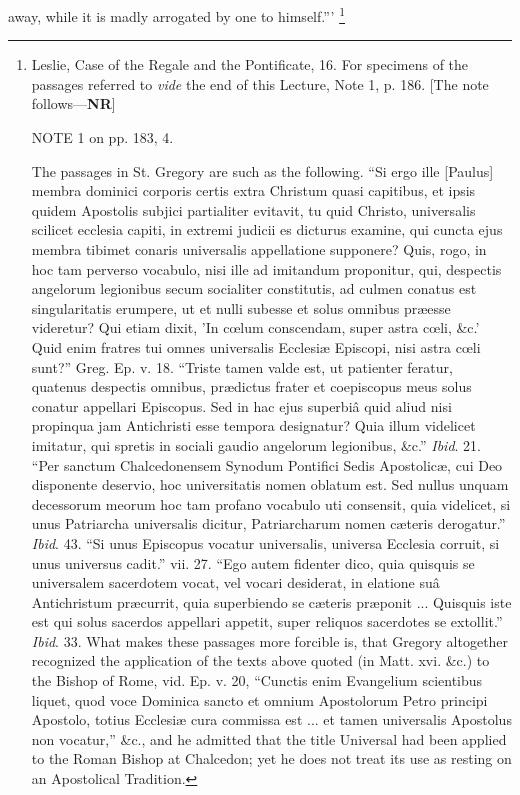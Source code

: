 away, while it is madly arrogated by one to himself.''' \footnote{Leslie, Case of the Regale and the
Pontificate, 16. For specimens of the passages referred to \emph{vide}
the end of this Lecture, Note 1, p. 186. [The note follows—\textbf{NR}]

NOTE
1 on pp. 183, 4.

The passages in St. Gregory are such as the
following. ``Si ergo ille [Paulus] membra dominici corporis certis
extra Christum quasi capitibus, et ipsis quidem Apostolis subjici
partialiter evitavit, tu quid Christo, universalis scilicet ecclesia
capiti, in extremi judicii es dicturus examine, qui cuncta ejus membra
tibimet conaris universalis appellatione supponere? Quis, rogo, in hoc
tam perverso vocabulo, nisi ille ad imitandum proponitur, qui,
despectis angelorum legionibus secum socialiter constitutis, ad culmen
conatus est singularitatis erumpere, ut et nulli subesse et solus
omnibus præesse videretur? Qui etiam dixit, 'In cœlum conscendam,
super astra cœli, \&c.' Quid enim fratres tui omnes universalis
Ecclesiæ Episcopi, nisi astra cœli sunt?'' Greg. Ep. v. 18.
``Triste tamen valde est, ut patienter feratur, quatenus despectis
omnibus, prædictus frater et coepiscopus meus solus conatur appellari
Episcopus. Sed in hac ejus superbiâ quid aliud nisi propinqua jam
Antichristi esse tempora designatur? Quia illum videlicet imitatur,
qui spretis in sociali gaudio angelorum legionibus, \&c.'' \emph{Ibid}.
21. ``Per sanctum Chalcedonensem Synodum Pontifici Sedis
Apostolicæ, cui Deo disponente deservio, hoc universitatis nomen
oblatum est. Sed nullus unquam decessorum meorum hoc tam profano
vocabulo uti consensit, quia videlicet, si unus Patriarcha universalis
dicitur, Patriarcharum nomen cæteris derogatur.'' \emph{Ibid}.
43. ``Si unus Episcopus vocatur universalis, universa Ecclesia
corruit, si unus universus cadit.'' vii. 27. ``Ego autem
fidenter dico, quia quisquis se universalem sacerdotem vocat, vel
vocari desiderat, in elatione suâ Antichristum præcurrit, quia
superbiendo se cæteris præponit ... Quisquis iste est qui solus
sacerdos appellari appetit, super reliquos sacerdotes se extollit.''
\emph{Ibid}. 33. What makes these passages more forcible is, that
Gregory altogether recognized the application of the texts above
quoted (in Matt. xvi. \&c.) to the Bishop of Rome, vid. Ep. v. 20,
``Cunctis enim Evangelium scientibus liquet, quod voce Dominica
sancto et omnium Apostolorum Petro principi Apostolo, totius Ecclesiæ
cura commissa est ... et tamen universalis Apostolus non vocatur,''
\&c., and he admitted that the title Universal had been applied to
the Roman Bishop at Chalcedon; yet he does not treat its use as
resting on an Apostolical Tradition.

}
